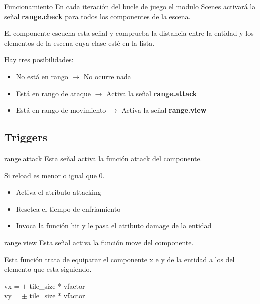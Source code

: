 \documentclass{beamer}
\begin{document}
\begin{frame}{Funcionamiento}
	En cada iteración del bucle de juego el modulo Scenes activará la señal
	\textbf{range.check} para todos los componentes de la escena.

	\medskip

	El componente escucha esta señal y comprueba la distancia entre la entidad y
	los elementos de la escena cuya clase esté en la lista.

	\medskip

	Hay tres posibilidades:
	\begin{itemize}
		\item No está en rango $\rightarrow$ No ocurre nada
		\item Está en rango de ataque $\rightarrow$ Activa la señal
		      \textbf{range.attack}
		\item Está en rango de movimiento $\rightarrow$ Activa la señal
		      \textbf{range.view}
	\end{itemize}
\end{frame}

\subsection{Triggers}

\begin{frame}{range.attack}
	Esta señal activa la función attack del componente.

	\medskip

	Si reload es menor o igual que 0.
	\begin{itemize}
		\item Activa el atributo attacking
		\item Resetea el tiempo de enfriamiento
		\item Invoca la función hit y le pasa el atributo damage de la entidad
	\end{itemize}
\end{frame}

\begin{frame}{range.view}
	Esta señal activa la función move del componente.

	\medskip

	Esta función trata de equiparar el componente x e y de la entidad a los del
	elemento que esta siguiendo.

	\begin{center}
		vx = $\pm$ tile\_size * vfactor\\
		vy = $\pm$ tile\_size * vfactor
	\end{center}
\end{frame}
\end{document}
